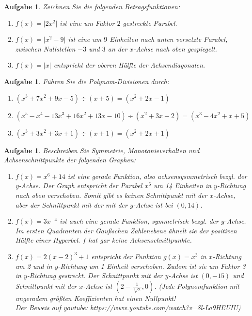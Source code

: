 \documentclass[12pt]{article}
\newtheorem{exercise}[satz]{Aufgabe}
\begin{document}
   \begin{exercise}
  Zeichnen Sie die folgenden Betragsfunktionen:
  \begin{enumerate}
  \item[(a)] $f(x) = \vert 2x^2 \vert$ ist eine um Faktor $2$ gestreckte Parabel. 
  \item[(b)] $f(x) = \vert x^2 - 9 \vert$ ist eine um $9$ Einheiten nach unten versetzte Parabel, zwischen Nullstellen $-3$ und $3$ an der $x$-Achse nach oben gespiegelt.
  \item[(c)]$f(x) = \vert x \vert$ entspricht der oberen H\"alfte der Achsendiagonalen.
  \end{enumerate}
   \end{exercise} 

   \begin{exercise}
  F\"uhren Sie die Polynom-Divisionen durch:
  \begin{enumerate}
  \item[(a)] $(x^3+7x^2+9x-5)\div(x+5) = (x^2+2x-1)$
  \item[(b)] $(x^5-x^4-13x^3+16x^2+13x-10)\div(x^2+3x-2) = (x^3-4x^2+x+5)$
  \item[(c)] $(x^3+3x^2+3x+1)\div(x+1) = (x^2+2x+1)$
  \end{enumerate}
   \end{exercise}

   \begin{exercise}
  Beschreiben Sie Symmetrie, Monotonieverhalten und Achsenschnittpunkte der folgenden Graphen:
  \begin{enumerate}
  \item[(a)] $f(x) = x^6 + 14$ ist eine gerade Funktion, also achsensysmmetrisch bezgl. der y-Achse. Der Graph entspricht der Parabel $x^6$ um 14 Einheiten in $y$-Richtung nach oben verschoben. Somit gibt es keinen Schnittpunkt mit der $x$-Achse, aber der Schnittpunkt mit der mit der $y$-Achse ist bei $(0,14)$.
  \item[(b)] $f(x) = 3x^{-4}$ ist auch eine gerade Funktion, symmetrisch bezgl. der $y$-Achse. Im ersten Quadranten der Gau\ss schen Zahlenebene \"ahnelt sie der positiven H\"alfte einer Hyperbel. $f$ hat gar keine Achsenschnittpunkte.
  \item[(c)] $f(x) = 2(x-2)^3 + 1$ entspricht der Funktion $g(x) = x^3$ in $x$-Richtung um 2 und in $y$-Richtung um 1 Einheit verschoben. Zudem ist sie um Faktor 3 in $y$-Richtung gestreckt. Der Schnittpunkt mit der $y$-Achse ist $(0,-15)$ und Schnittpunkt mit der $x$-Achse ist $(2-\frac{1}{\sqrt[3]{2}},0)$. (Jede Polynomfunktion mit ungeradem gr\"o\ss ten Koeffizienten hat einen Nullpunkt!\\
  Der Beweis auf youtube: https://www.youtube.com/watch?v=8l-La9HEUIU)
  \end{enumerate}
   \end{exercise}
\end{document}
